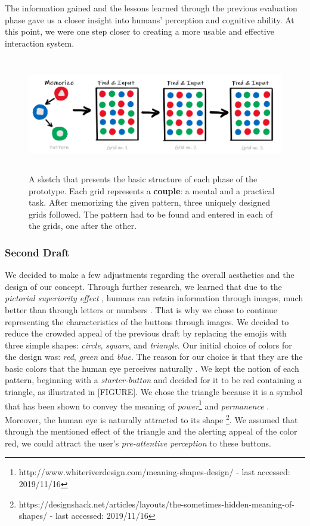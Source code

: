 The information gained and the lessons learned through the previous evaluation phase gave us a closer insight into humans' perception and cognitive ability. At this point, we were one step closer to creating a more usable and effective interaction system.

\begin{figure}[t!]
\centering
\includegraphics[width=13cm, height=5cm]{Chapters/graphics/seconddraft.PNG}
\caption{A sketch that presents the basic structure of each phase of the prototype. Each grid represents a \textbf{couple}: a mental and a practical task. After memorizing the given pattern, three uniquely designed grids followed. The pattern had to be found and entered in each of the grids, one after the other.}
\label{fig:secondDraft}
\end{figure}

\subsubsection{Second Draft} \label{4.2.2.3}

We decided to make a few adjustments regarding the overall aesthetics and the design of our concept. Through further research, we learned that due to the \textit{pictorial superiority effect} \cite{pictorial}, humans can retain information through images, much better than through letters or numbers \cite{pictorial, 2014}. That is why we chose to continue representing the characteristics of the buttons through images. We decided to reduce the crowded appeal of the previous draft by replacing the emojis with three simple shapes: \textit{circle}, \textit{square}, and \textit{triangle}. Our initial choice of colors for the design was: \textit{red}, \textit{green} and \textit{blue}. The reason for our choice is that they are the basic colors that the human eye perceives naturally \cite{Butz2014}. We kept the notion of each pattern, beginning with a \textit{starter-button} and decided for it to be red containing a triangle, as illustrated in [FIGURE]. We chose the triangle because it is a symbol that has been shown to convey the meaning of \textit{power}\footnote{http://www.whiteriverdesign.com/meaning-shapes-design/ - last accessed: 2019/11/16} and \textit{permanence} \cite{Frutiger1998}.  Moreover, the human eye is naturally attracted to its shape \footnote{https://designshack.net/articles/layouts/the-sometimes-hidden-meaning-of-shapes/ - last accessed: 2019/11/16}. We assumed that through the mentioned effect of the triangle and the alerting appeal of the color red, we could attract the user's \textit{pre-attentive perception} \cite{Butz2014} to these buttons. \\

